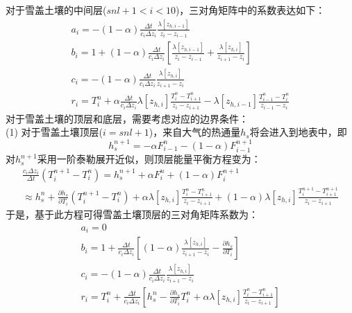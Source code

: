 对于雪盖土壤的中间层($snl+1<i<10$)，三对角矩阵中的系数表达如下：
\begin{equation}
\begin{array}{c}a_{i}=-(1-\alpha) \frac{\Delta t}{c_{i} \Delta z_{i}} \frac{\lambda\left[z_{h, i-1}\right]}{z_{i}-z_{i-1}} \\ b_{i}=1+(1-\alpha) \frac{\Delta t}{c_{i} \Delta z_{i}}\left[\frac{\lambda\left[z_{h, i-1}\right]}{z_{i}-z_{i-1}}+\frac{\lambda\left[z_{h, i}\right]}{z_{i+1}-z_{i}}\right] \\ c_{i}=-(1-\alpha) \frac{\Delta t}{c_{i} \Delta z_{i}} \frac{\lambda\left[z_{h, i}\right]}{z_{i+1}-z_{i}} \\ r_{i}=T_{i}^{n}+\alpha \frac{\Delta t}{c_{i} \Delta z_{i}} \lambda\left[z_{h, i}\right] \frac{T_{i}^{n}-T_{i+1}^{n}}{z_{i}-z_{i+1}}-\lambda\left[z_{h, i-1}\right] \frac{T_{i-1}^{n}-T_{i}^{n}}{z_{i-1}-z_{i}}\end{array}
\end{equation}
对于雪盖土壤的顶层和底层，需要考虑对应的边界条件：\\
(1) 对于雪盖土壤顶层($i=snl+1$)，来自大气的热通量$h_s$将会进入到地表中，即
\begin{equation}
h_{s}^{n+1}=-\alpha F_{i-1}^{n}-(1-\alpha) F_{i-1}^{n+1}
\end{equation}
对$h_s^{n+1}$采用一阶泰勒展开近似，则顶层能量平衡方程变为：
\begin{equation}
\begin{array}{l}\frac{c_{i} \Delta z_{i}}{\Delta t}\left(T_{i}^{n+1}-T_{i}^{n}\right)=h_{s}^{n+1}+\alpha F_{i}^{n}+(1-\alpha) F_{i}^{n+1} \\ \approx h_{s}^{n}+\frac{\partial h_{s}}{\partial T_{i}}\left(T_{i}^{n+1}-T_{i}^{n}\right)+\alpha \lambda\left[z_{h, i}\right] \frac{T_{i}^{n}-T_{i+1}^{n}}{z_{i}-z_{i+1}}+(1-\alpha) \lambda\left[z_{h, i}\right] \frac{T_{i}^{n+1}-T_{i+1}^{n+1}}{z_{i}-z_{i+1}}\end{array}
\end{equation}
于是，基于此方程可得雪盖土壤顶层的三对角矩阵系数为：
\begin{equation}
\begin{array}{c}a_{i}=0 \\ b_{i}=1+\frac{\Delta t}{c_{i} \Delta z_{i}}\left[(1-\alpha) \frac{\lambda\left[z_{h, i}\right]}{z_{i+1}-z_{i}}-\frac{\partial h_{s}}{\partial T_{i}}\right] \\ c_{i}=-(1-\alpha) \frac{\Delta t}{c_{i} \Delta z_{i}} \frac{\lambda\left[z_{h, i}\right]}{z_{i+1}-z_{i}} \\ r_{i}=T_{i}^{n}+\frac{\Delta t}{c_{i} \Delta z_{i}}\left[h_{s}^{n}-\frac{\partial h_{s}}{\partial T_{i}} T_{i}^{n}+\alpha \lambda\left[z_{h, i}\right] \frac{T_{i}^{n}-T_{i+1}^{n}}{z_{i}-z_{i+1}}\right]\end{array}
\end{equation}

